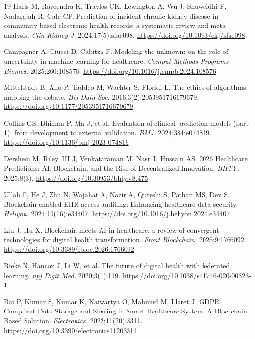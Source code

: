 \documentclass[12pt,a4paper]{article}
\begin{document}
\begin{thebibliography}{19}
Haris M, Raveendra K, Travlos CK, Lewington A, Wu J,
Shuweidhi F, Nadarajah R, Gale CP. Prediction of incident
chronic kidney disease in community-based electronic health
records: a systematic review and meta-analysis.
\textit{Clin Kidney J.} 2024;17(5):sfae098.
\url{https://doi.org/10.1093/ckj/sfae098}

Campagner A, Ciucci D, Cabitza F. Modeling the unknown: on the
role of uncertainty in machine learning for healthcare.
\textit{Comput Methods Programs Biomed.} 2025;260:108576.
\url{https://doi.org/10.1016/j.cmpb.2024.108576}

Mittelstadt B, Allo P, Taddeo M, Wachter S, Floridi L. The
ethics of algorithms: mapping the debate. \textit{Big Data Soc.}
2016;3(2):2053951716679679.
\url{https://doi.org/10.1177/2053951716679679}

Collins GS, Dhiman P, Ma J, et al. Evaluation of clinical
prediction models (part 1): from development to external
validation. \textit{BMJ.} 2024;384:e074819.
\url{https://doi.org/10.1136/bmj-2023-074819}

Dershem M, Riley~III J, Venkataraman M, Nasr J, Hussain AS.
2026 Healthcare Predictions: AI, Blockchain, and the Rise of
Decentralized Innovation. \textit{BHTY.} 2025;8(3).
\url{https://doi.org/10.30953/bhty.v8.475}

Ullah F, He J, Zhu N, Wajahat A, Nazir A, Qureshi S,
Pathan MS, Dev S. Blockchain-enabled EHR access auditing:
Enhancing healthcare data security. \textit{Heliyon.}
2024;10(16):e34407.
\url{https://doi.org/10.1016/j.heliyon.2024.e34407}

Liu J, Hu X. Blockchain meets AI in healthcare: a review of
convergent technologies for digital health transformation.
\textit{Front Blockchain.} 2026;9:1766092.
\url{https://doi.org/10.3389/fbloc.2026.1766092}

Rieke N, Hancox J, Li W, et al. The future of digital health
with federated learning. \textit{npj Digit Med.}
2020;3(1):119.
\url{https://doi.org/10.1038/s41746-020-00323-1}

Bai P, Kumar S, Kumar K, Kaiwartya O, Mahmud M, Lloret J.
GDPR Compliant Data Storage and Sharing in Smart Healthcare
System: A Blockchain-Based Solution. \textit{Electronics.}
2022;11(20):3311.
\url{https://doi.org/10.3390/electronics11203311}

\end{thebibliography}
\end{document}
